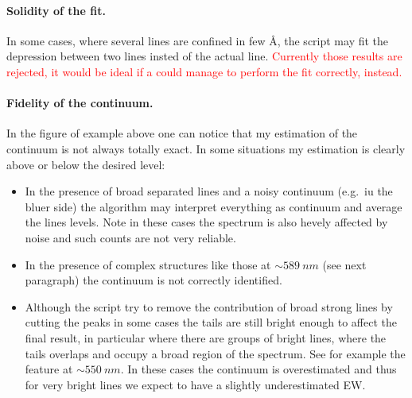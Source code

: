 \documentclass{article}
\newcommand{\nota}[1]{\textcolor{red}{#1}}
\begin{document}
\paragraph{Solidity of the fit.} In some cases, where several lines are confined in few \si{\angstrom}, the script may fit the depression between two lines insted of the actual line. \nota{Currently those results are rejected, it would be ideal if a could manage to perform the fit correctly, instead.}

\paragraph{Fidelity of the continuum.} In the figure of example above one can notice that my estimation of the continuum is not always totally exact. In some situations my estimation is clearly above or below the desired level:
\begin{itemize}
	\item In the presence of broad separated lines and a noisy continuum (e.g.\ iu the bluer side) the algorithm may interpret everything as continuum and average the lines levels. Note in these cases the spectrum is also hevely affected by noise and such counts are not very reliable.
	\item In the presence of complex structures like those at $\sim \SI{589}{nm}$ (see next paragraph) the continuum is not correctly identified.
	\item Although the script try to remove the contribution of broad strong lines by cutting the peaks in some cases the tails are still bright enough to affect the final result, in particular where there are groups of bright lines, where the tails overlaps and occupy a broad region of the spectrum. See for example the feature at $\sim \SI{550}{nm}$. In these cases the continuum is overestimated and thus for very bright lines we expect to have a slightly underestimated EW.
\end{itemize}
\end{document}

